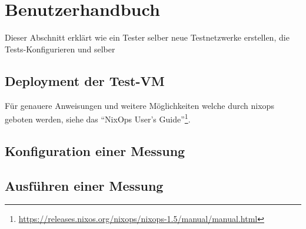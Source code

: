 \section{Benutzerhandbuch}

Dieser Abschnitt erklärt wie ein Tester selber neue Testnetzwerke erstellen, die Tests-Konfigurieren und selber

\subsection{Deployment der Test-VM}

Für genauere Anweisungen und weitere Möglichkeiten welche durch nixops geboten werden, siehe das ``NixOps User's Guide''\footnote{\url{https://releases.nixos.org/nixops/nixops-1.5/manual/manual.html}}.


\subsection{Konfiguration einer Messung}

\subsection{Ausführen einer Messung}
